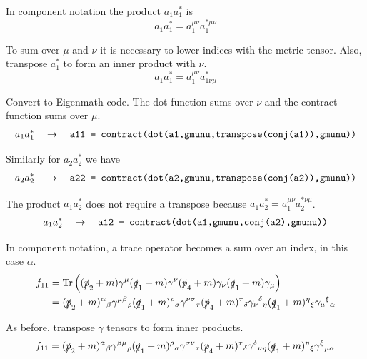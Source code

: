 \documentclass[12pt]{article}
\begin{document}
\noindent
In component notation the product $a_1a_1^*$ is
\begin{equation*}
a_1a_1^*=a_1^{\mu\nu}a_1^{*\mu\nu}
\end{equation*}

\noindent
To sum over $\mu$ and $\nu$ it is necessary to lower indices with the metric tensor.
Also, transpose $a_1^*$ to form an inner product with $\nu$.
\begin{equation*}
a_1a_1^*=a_1^{\mu\nu}a_{1\nu\mu}^*
\end{equation*}

\noindent
Convert to Eigenmath code.
The dot function sums over $\nu$ and the contract function sums over $\mu$.
\begin{equation*}
a_1a_1^*
\quad\rightarrow\quad
\text{\tt a11 = contract(dot(a1,gmunu,transpose(conj(a1)),gmunu))}
\end{equation*}

\noindent
Similarly for $a_2a_2^*$ we have
\begin{equation*}
a_2a_2^*
\quad\rightarrow\quad
\text{\tt a22 = contract(dot(a2,gmunu,transpose(conj(a2)),gmunu))}
\end{equation*}

\noindent
The product $a_1a_2^*$ does not require a transpose because $a_1a_2^*=a_1^{\mu\nu}a_2^{*\nu\mu}$.
\begin{equation*}
a_1a_2^*
\quad\rightarrow\quad
\text{\tt a12 = contract(dot(a1,gmunu,conj(a2),gmunu))}
\end{equation*}

\noindent
In component notation, a trace operator becomes a sum over an index, in this case $\alpha$.
\begin{align*}
f_{11}
&=
\mathop{\rm Tr}
\left(
(\slashed{p}_2+m)\gamma^\mu(\slashed{q}_1+m)\gamma^\nu(\slashed{p}_4+m)\gamma_\nu(\slashed{q}_1+m)\gamma_\mu
\right)\\
&=
(\slashed{p}_2+m)^\alpha{}_\beta
\gamma^{\mu\beta}{}_\rho
(\slashed{q}_1+m)^\rho{}_\sigma
\gamma^{\nu\sigma}{}_\tau
(\slashed{p}_4+m)^\tau{}_\delta
\gamma_\nu{}^\delta{}_\eta
(\slashed{q}_1+m)^\eta{}_\xi
\gamma_\mu{}^\xi{}_\alpha
\end{align*}

\noindent
As before, transpose $\gamma$ tensors to form inner products.
\begin{equation*}
f_{11}=
(\slashed{p}_2+m)^\alpha{}_\beta
\gamma^{\beta\mu}{}_\rho
(\slashed{q}_1+m)^\rho{}_\sigma
\gamma^{\sigma\nu}{}_\tau
(\slashed{p}_4+m)^\tau{}_\delta
\gamma^\delta{}_{\nu\eta}
(\slashed{q}_1+m)^\eta{}_\xi
\gamma^\xi{}_{\mu\alpha}
\end{equation*}
\end{document}
